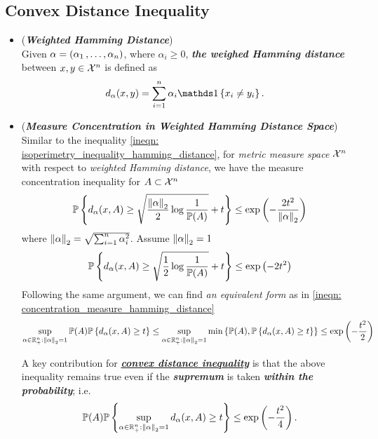 \documentclass[11pt]{article}
\begin{document}
\subsection{Convex Distance Inequality}
\begin{itemize}
\item \begin{definition} (\textbf{\emph{Weighted Hamming Distance}}) \\
Given $\alpha = (\alpha_1 \,{,}\ldots{,}\, \alpha_n)$, where $\alpha_i  \ge 0$, \emph{\textbf{the weighed Hamming distance}} between $x , y \in {\mathcal X}^n$ is defined as
\begin{align*}
d_{\alpha}(x, y) &= \sum_{i=1}^{n}\alpha_i\ind{x_i \neq y_i}.
\end{align*}
\end{definition}

\item \begin{remark} (\textbf{\emph{Measure Concentration  in Weighted Hamming Distance Space}})\\
Similar to the inequality \eqref{ineqn: isoperimetry_inequality_hamming_distance}, for \emph{metric measure space} ${\mathcal X}^n$ with respect to \emph{weighted Hamming distance}, we have the measure concentration inequality for $A \subset {\mathcal X}^n$
\begin{align*}
{\mathbb P}\left\{d_{\alpha}(x, A) \ge \sqrt{\frac{\left\|\alpha\right\|_{2}}{2}\log \frac{1}{{\mathbb P}(A)}} + t\right\} \le \exp\left(-\frac{2t^2}{\left\|\alpha\right\|_{2}}\right)
\end{align*} where $\left\|\alpha\right\|_{2} = \sqrt{\sum_{i=1}^n \alpha_i^2}$.  Assume $\left\|\alpha\right\|_{2} = 1$
\begin{align*}
{\mathbb P}\left\{d_{\alpha}(x, A) \ge \sqrt{\frac{1}{2}\log \frac{1}{{\mathbb P}(A)}} + t\right\} \le \exp\left(-2t^2\right)
\end{align*}
Following the same argument, we can find \emph{an equivalent form} as in \eqref{ineqn: concentration_measure_hamming_distance}
\begin{align*}
\sup_{\alpha \in {\mathbb R}_{+}^{n}: \left\|\alpha\right\|_{2} = 1}{\mathbb P}(A){\mathbb P}\left\{d_{\alpha}(x, A) \ge t\right\} \le \sup_{\alpha \in {\mathbb R}_{+}^{n}: \left\|\alpha\right\|_{2} = 1}\min\left\{{\mathbb P}(A), {\mathbb P}\left\{d_{\alpha}(x, A) \ge t\right\}\right\} \le  \exp\left(-\frac{t^2}{2}\right)
\end{align*}

A key contribution for \underline{\emph{\textbf{convex distance inequality}}} is that  the above inequality remains true even if the \emph{\textbf{supremum}} is taken \emph{\textbf{within the probability}}; i.e. 
\begin{align*}
{\mathbb P}(A){\mathbb P}\left\{\sup_{\alpha \in {\mathbb R}_{+}^{n}: \left\|\alpha\right\|_{2} = 1}d_{\alpha}(x, A) \ge t\right\} \le  \exp\left(-\frac{t^2}{4}\right).
\end{align*}
\end{remark}


\end{itemize}
\end{document}
